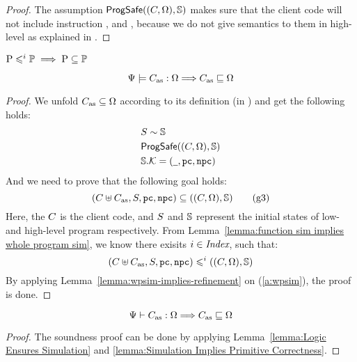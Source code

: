 \begin{proof}
    The assumption $\textsf{ProgSafe}((C, \Omega), \mathbb{S})$ 
    makes sure that the client code will not include instruction 
    \csave{}, \crestore{} and \cwr{}, because we do not give 
    semantics to them in high-level as explained in 
    \Sec{\ref{subsec:High-level Pseudo-SPARCv8 Language}}. 
\end{proof}

\begin{lemma}
    \label{lemma:wpsim-implies-refinement}
    \em
    $\text{P} \leqslant^{i} \mathbb{P} \implies \text{P} \subseteq \mathbb{P}$  
\end{lemma}

\begin{lemma}
    \em
    \label{lemma:Simulation Implies Primitive Correctness}
    \[
        {\Psi} \models {C_{\text{as}}} : {\Omega} 
        \Longrightarrow
        C_{\text{as}} \sqsubseteq \Omega
    \]
\end{lemma}
\begin{proof}
    We unfold $C_{\text{as}} \subseteq \Omega$ according to 
    its definition (in \Def{\ref{def:prim-correctness}}) 
    and get the following holds: 
    \begin{align}
        & {S} \sim {\mathbb{S}} \\
        & \textsf{ProgSafe}((C, \Omega), \mathbb{S}) \\
        & \mathbb{S}.\mathcal{K} = 
            (\underline{\ \,}, \texttt{pc}, \texttt{npc}) 
    \end{align}
    And we need to prove that the following goal holds:
    \begin{equation}
        (C\uplus C_{\text{as}}, S, \texttt{pc}, \texttt{npc})
        \subseteq
        ((C, \Omega), \mathbb{S})
        \tag{g3} \label{g3}
    \end{equation}
    Here, the $C$ is the client code, and 
    $S$ and $\mathbb{S}$ represent the initial states 
    of low- and high-level program respectively. 
    From Lemma~\ref{lemma:function sim implies whole program sim}, 
    we know there exisits $i \in \textit{Index}$, such that: 
    \begin{equation}
        (C\uplus C_{\text{as}}, S, \texttt{pc}, \texttt{npc})
        \leqslant^{i}
        ((C, \Omega), \mathbb{S}) \label{a:wpsim}
    \end{equation}
    By applying Lemma~\ref{lemma:wpsim-implies-refinement}
    on (\ref{a:wpsim}), the proof is done. 
\end{proof}

\begin{theorem}
    \em
    \label{thm:logic soundness}
    \[
        {\Psi} \vdash {C_{\text{as}}} : {\Omega} \Longrightarrow
        C_{\text{as}} \sqsubseteq \Omega
    \]
\end{theorem}
\begin{proof}
    The soundness proof can be done by applying 
    Lemma~\ref{lemma:Logic Ensures Simulation} and 
    \ref{lemma:Simulation Implies Primitive Correctness}.
\end{proof}


